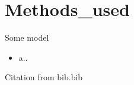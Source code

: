 \section{Methods_used}


 \begin{frame}[c]{Some model}
\begin{minipage}{0.45\textwidth}
     \begin{itemize}
         \item a..
         
     \end{itemize}
     
\end{minipage}
\begin{minipage}{0.5\textwidth}

\centering

\end{minipage}

Citation from bib.bib \cite{lecun2015deep}

 \end{frame}
